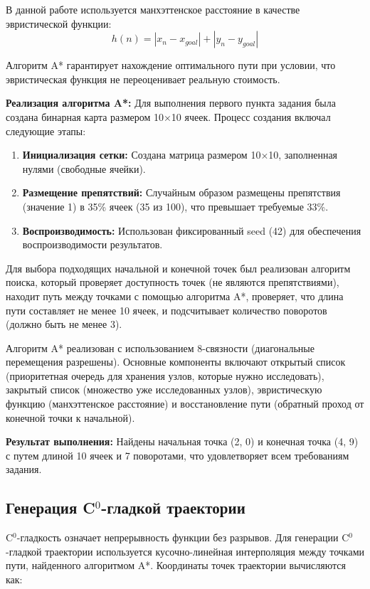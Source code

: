 В данной работе используется манхэттенское расстояние в качестве эвристической функции:
$$h(n) = |x_n - x_{goal}| + |y_n - y_{goal}|$$

Алгоритм A* гарантирует нахождение оптимального пути при условии, что эвристическая функция не переоценивает реальную стоимость.

\textbf{Реализация алгоритма A*:} Для выполнения первого пункта задания была создана бинарная карта размером 10×10 ячеек. Процесс создания включал следующие этапы:

\begin{enumerate}
\item \textbf{Инициализация сетки:} Создана матрица размером 10×10, заполненная нулями (свободные ячейки).
\item \textbf{Размещение препятствий:} Случайным образом размещены препятствия (значение 1) в 35\% ячеек (35 из 100), что превышает требуемые 33\%.
\item \textbf{Воспроизводимость:} Использован фиксированный seed (42) для обеспечения воспроизводимости результатов.
\end{enumerate}

Для выбора подходящих начальной и конечной точек был реализован алгоритм поиска, который проверяет доступность точек (не являются препятствиями), находит путь между точками с помощью алгоритма A*, проверяет, что длина пути составляет не менее 10 ячеек, и подсчитывает количество поворотов (должно быть не менее 3).

Алгоритм A* реализован с использованием 8-связности (диагональные перемещения разрешены). Основные компоненты включают открытый список (приоритетная очередь для хранения узлов, которые нужно исследовать), закрытый список (множество уже исследованных узлов), эвристическую функцию (манхэттенское расстояние) и восстановление пути (обратный проход от конечной точки к начальной).

\textbf{Результат выполнения:} Найдены начальная точка (2, 0) и конечная точка (4, 9) с путем длиной 10 ячеек и 7 поворотами, что удовлетворяет всем требованиям задания.

\subsection{Генерация C$^0$-гладкой траектории}

C$^0$-гладкость означает непрерывность функции без разрывов. Для генерации C$^0$-гладкой траектории используется кусочно-линейная интерполяция между точками пути, найденного алгоритмом A*. Координаты точек траектории вычисляются как:

